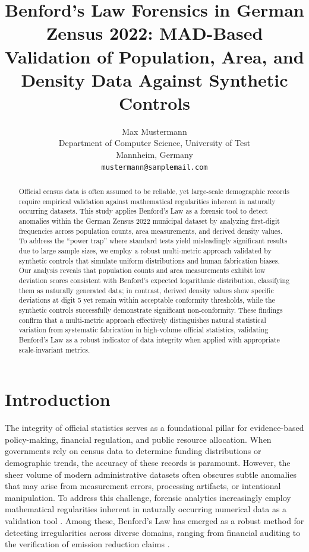 \documentclass[11pt,a4paper]{article}
\title{\bfseries Benford's Law Forensics in German Zensus 2022: MAD-Based Validation of Population, Area, and Density Data Against Synthetic Controls}
\author{%
Max Mustermann\\
{\small Department of Computer Science, University of Test}\\
{\small Mannheim, Germany}\\
{\small \texttt{mustermann@samplemail.com}}
}
\date{}
\begin{document}
\maketitle
\thispagestyle{empty}

\begin{abstract}
\noindent
Official census data is often assumed to be reliable, yet large-scale demographic records require empirical validation against mathematical regularities inherent in naturally occurring datasets. This study applies Benford's Law as a forensic tool to detect anomalies within the German Zensus 2022 municipal dataset by analyzing first-digit frequencies across population counts, area measurements, and derived density values. To address the ``power trap'' where standard tests yield misleadingly significant results due to large sample sizes, we employ a robust multi-metric approach validated by synthetic controls that simulate uniform distributions and human fabrication biases. Our analysis reveals that population counts and area measurements exhibit low deviation scores consistent with Benford's expected logarithmic distribution, classifying them as naturally generated data; in contrast, derived density values show specific deviations at digit 5 yet remain within acceptable conformity thresholds, while the synthetic controls successfully demonstrate significant non-conformity. These findings confirm that a multi-metric approach effectively distinguishes natural statistical variation from systematic fabrication in high-volume official statistics, validating Benford's Law as a robust indicator of data integrity when applied with appropriate scale-invariant metrics.
\end{abstract}

\section{Introduction}
The integrity of official statistics serves as a foundational pillar for evidence-based policy-making, financial regulation, and public resource allocation. When governments rely on census data to determine funding distributions or demographic trends, the accuracy of these records is paramount. However, the sheer volume of modern administrative datasets often obscures subtle anomalies that may arise from measurement errors, processing artifacts, or intentional manipulation. To address this challenge, forensic analytics increasingly employ mathematical regularities inherent in naturally occurring numerical data as a validation tool \cite{Shalini2023DataQA}. Among these, Benford's Law has emerged as a robust method for detecting irregularities across diverse domains, ranging from financial auditing to the verification of emission reduction claims \cite{Cole2019TestingTE}.
\end{document}
